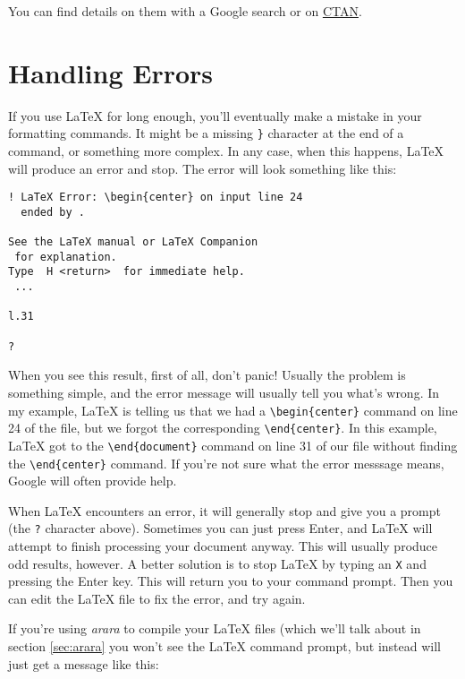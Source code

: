 You can find details on them with a Google search or on
\href{https://www.ctan.org}{CTAN}.

\section{Handling Errors} \label{sec:tex_errors}

If you use \LaTeX{} for long enough, you'll eventually make a mistake in your
formatting commands. It might be a missing \texttt{\}} character at the end of
a command, or something more complex. In any case, when this happens, \LaTeX{}
will produce an error and stop. The error will look something like this:

\begin{verbatim}
! LaTeX Error: \begin{center} on input line 24 
  ended by .

See the LaTeX manual or LaTeX Companion 
 for explanation.
Type  H <return>  for immediate help.
 ...

l.31 

?
\end{verbatim}

When you see this result, first of all, don't panic! Usually the problem is
something simple, and the error message will usually tell you what's wrong. In
my example, \LaTeX{} is telling us that we had a
\texttt{\textbackslash{}begin\{center\}} command on line 24 of the file, but
we forgot the corresponding \texttt{\textbackslash{}end\{center\}}. In this
example, \LaTeX{} got to the \texttt{\textbackslash{}end\{document\}} command
on line 31 of our file without finding the
\texttt{\textbackslash{}end\{center\}} command. If you're not sure what the
error messsage means, Google will often provide help.

When \LaTeX{} encounters an error, it will generally stop and give you a prompt
(the \texttt{?} character above). Sometimes you can just press Enter, and
\LaTeX{} will attempt to finish processing your document anyway. This will
usually produce odd results, however. A better solution is to stop \LaTeX{} by
typing an \texttt{X} and pressing the Enter key. This will return you to your
command prompt. Then you can edit the \LaTeX{} file to fix the error, and try
again.

If you're using \emph{arara} to compile your \LaTeX{} files (which we'll talk
about in section \ref{sec:arara} you won't see the \LaTeX{} command prompt,
but instead will just get a message like this:


